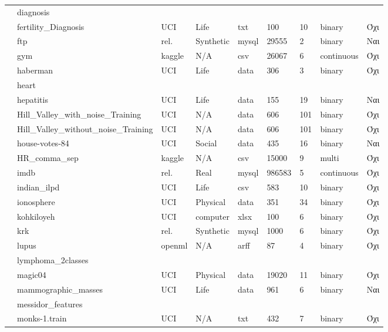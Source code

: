 {\begin{longtable}{|l| l| l | l | l | l |l | l | l | }
 			\rownumber & diagnosis & & & & & & & \\
 			\rownumber & fertility\_Diagnosis & UCI & Life & txt & 100 & 10 & binary & Όχι \\
 		    \rownumber & ftp \citep{ftp} & rel. & Synthetic & mysql & 29555  & 2 & binary  & Ναι  \\
 			\rownumber & gym \citep{gym} & kaggle & N/A & csv & 26067 & 6 & continuous & Όχι \\
 			\rownumber & haberman \citep{haberman} & UCI & Life & data &  306 & 3 & binary & Όχι \\
 			\rownumber & heart & & & & & & & \\
 			\rownumber & hepatitis \citep{hepatitis} & UCI & Life & data & 155 & 19 & binary & Ναι \\
 			\rownumber & Hill\_Valley\_with\_noise\_Training & UCI & N/A & data & 606 & 101 & binary & Όχι \\
 			\rownumber & Hill\_Valley\_without\_noise\_Training & UCI & N/A & data & 606 & 101 & binary & Όχι \\
 			\rownumber & house-votes-84 & UCI & Social & data & 435 & 16  & binary & Ναι  \\
 			\rownumber & HR\_comma\_sep \citep{hr} & kaggle & N/A & csv & 15000 & 9 & multi & Όχι \\
 			\rownumber & imdb \citep{imdb} & rel. & Real & mysql & 986583 & 5 & continuous & Όχι \\
 			\rownumber & indian\_ilpd & UCI & Life & csv & 583 & 10 & binary & Όχι \\
 			\rownumber & ionosphere \citep{ionoshpere} & UCI & Physical & data  & 351 & 34  &  binary & Όχι \\
 			\rownumber & kohkiloyeh & UCI & computer& xlsx& 100 & 6 & binary & Όχι \\
 			\rownumber & krk \citep{krk} & rel. & Synthetic & mysql & 1000  & 6 & binary & Όχι \\
 			\rownumber & lupus \citep{lupus} & openml & N/A & arff & 87 & 4 & binary & Όχι \\
 			\rownumber & lymphoma\_2classes & & & & & & & \\
 			\rownumber & magic04 & UCI & Physical & data & 19020 & 11 & binary & Όχι \\
 			\rownumber & mammographic\_masses & UCI & Life & data & 961 & 6 & binary & Ναι \\
 			\rownumber & messidor\_features & & & & & & & \\
 			\rownumber & monks-1.train \citep{monks} & UCI & N/A & txt & 432 & 7 & binary & Όχι \\

\end{longtable}}
